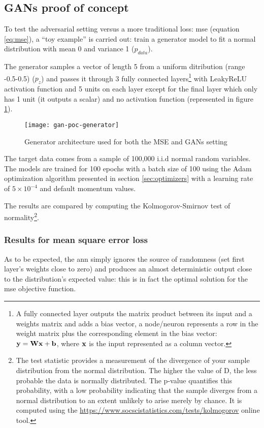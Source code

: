 \documentclass[../main.tex]{subfiles}
\begin{document}
\subsection{GANs proof of concept}
To test the adversarial setting versus a more traditional loss: \gls{mse}
(equation \ref{eq:mse}),
a ``toy example'' is carried out\footnotemark: train a generator
model to fit a normal distribution with mean 0 and variance 1 ($p_{data}$).

The generator samples a vector of length 5
from a uniform ditribution (range -0.5-0.5) ($p_z$) and passes
it through 3 fully connected layers\footnote{A fully connected layer outputs
the matrix product between its input and a weights matrix and adds a bias vector,
a node/neuron represents a row in the weight matrix plus the corresponding
element in the bias vector: $\mathbf{y} = \mathbf{W}\mathbf{x} + \mathbf{b}$, where
$\mathbf{x}$ is the input represented as a column vector.}
with LeakyReLU activation function and 5 units on each layer except for the
final layer which only has 1 unit (it outputs a scalar) and no activation
function (represented in figure \ref{fig:gan-poc-generator}).

\begin{figure}[h]
\centering
\texttt{[image: gan-poc-generator]}
\caption{Generator architecture used for both the MSE and GANs setting}
\label{fig:gan-poc-generator}
\end{figure}

The target data comes from a sample of 100,000 i.i.d normal random
variables.  The models are trained for 100 epochs with a batch size of 100
using the Adam optimization algorithm presented in section \ref{sec:optimizers}
with a learning rate of $5 \times 10^{-4}$ and default momentum values.

The results are compared by computing the Kolmogorov-Smirnov test of
normality\footnote{The test statistic provides a measurement of the divergence
of your sample distribution from the normal distribution.
The higher the value of D, the less probable  the data is normally distributed.
The p-value quantifies this probability, with a low probability indicating that
the sample diverges from a normal distribution to an extent unlikely to arise
merely by chance.  It is computed
using the \url{https://www.socscistatistics.com/tests/kolmogorov} online tool.}.

\subsubsection{Results for mean square error loss}
As to be expected, the \gls{ann} simply ignores the source of randomness
(set first layer's weights close to zero) and produces an almost deterministic
output close to the distribution's expected value: this is in fact the optimal
solution for the \gls{mse} objective function.
\end{document}
